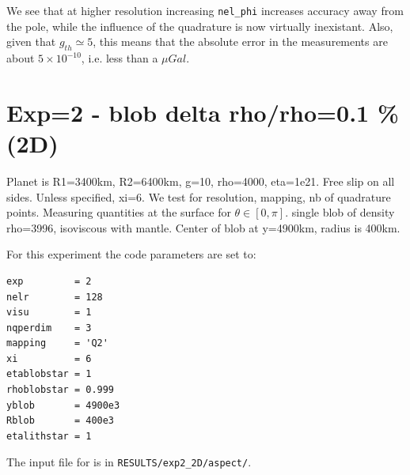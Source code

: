 We see that at higher resolution increasing {\tt nel\_phi} 
increases accuracy away from the pole, while 
the influence of the quadrature is now virtually inexistant.
Also, given that $g_{th}\simeq 5$, this means that the absolute error in the measurements 
are about $5\times 10^{-10}$, i.e. less than a $\mu Gal$.


\newpage
\section*{Exp=2 - blob delta rho/rho=0.1 \% (2D)}

Planet is R1=3400km, R2=6400km, g=10, rho=4000, eta=1e21.
Free slip on all sides. Unless specified, xi=6.
We test for resolution, mapping, nb of quadrature points.
Measuring quantities at the surface for $\theta\in[0,\pi]$.
single blob of density rho=3996, isoviscous with mantle.
Center of blob at y=4900km, radius is 400km.

For this experiment the code parameters are set to:
\begin{lstlisting}
exp         = 2
nelr        = 128 
visu        = 1
nqperdim    = 3
mapping     = 'Q2' 
xi          = 6
etablobstar = 1
rhoblobstar = 0.999
yblob       = 4900e3
Rblob       = 400e3
etalithstar = 1
\end{lstlisting}

The input file for \aspect{} is in {\tt RESULTS/exp2\_2D/aspect/}.


